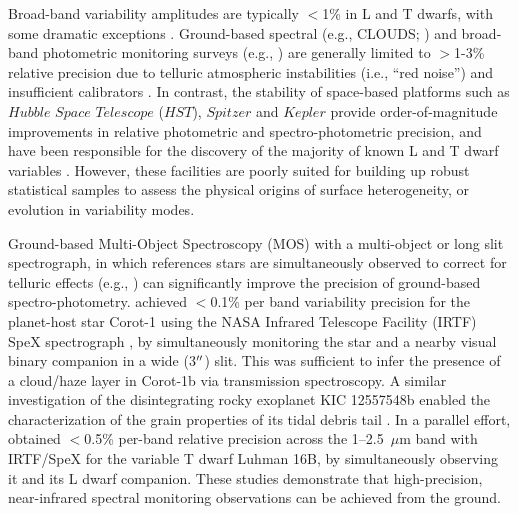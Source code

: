 \documentclass[twocolumn]{aastex6}
\begin{document}
Broad-band variability amplitudes are typically $<$1\% in L and T dwarfs, with some dramatic exceptions \citep{2009ApJ...701.1534A,2012ApJ...750..105R,2013A&A...555L...5G,2016ApJ...829L..32L}. 
Ground-based spectral (e.g., CLOUDS; \citealt{2008A&A...487..277G}) and broad-band photometric monitoring surveys (e.g., \citealt{1999A&A...348..800B,2003MNRAS.346..473K,2014ApJ...793...75R,2014A&A...566A.111W}) are generally limited to $>$1-3\% relative precision due to telluric atmospheric instabilities (i.e., ``red noise'') and insufficient calibrators \citep{2003MNRAS.339..477B}.
In contrast, the stability of space-based platforms such as $Hubble$ $Space$ $Telescope$ ($HST$), $Spitzer$ and $Kepler$ provide order-of-magnitude improvements in relative photometric and spectro-photometric precision, and have been responsible for the discovery of the majority of known L and T dwarf variables \citep{2013ApJ...768..121A,2013ApJ...779..172G,2015ApJ...799..154M}. However, these facilities are poorly suited for building up robust statistical samples to assess the physical origins of surface heterogeneity, or evolution in variability modes. 

Ground-based Multi-Object Spectroscopy (MOS) with a multi-object or long slit spectrograph, in which references stars are simultaneously observed to correct for telluric effects  (e.g., \citealt{bean10,bean2013,gibson13clouds,stevenson2016hatp26}) can significantly improve the precision of ground-based spectro-photometry. \citet{2014ApJ...783....5S} achieved $<$0.1\% per band variability precision for the planet-host star Corot-1 using the NASA Infrared Telescope Facility (IRTF) SpeX spectrograph \citep{2003PASP..115..362R}, by simultaneously monitoring the star and a nearby visual binary companion in a wide (3$\mbox{$^{\prime\prime}$}$) slit. This was sufficient to infer the presence of a cloud/haze layer in Corot-1b via transmission spectroscopy. A similar investigation of the disintegrating rocky exoplanet KIC 12557548b  enabled the characterization of the grain properties of its tidal debris tail \citep{2016ApJ...826..156S}. In a parallel effort, \citet{2014ApJ...785...48B} obtained $<$0.5\% per-band relative precision across the 1--2.5~$\mu$m band with IRTF/SpeX for the variable T dwarf Luhman 16B, by simultaneously observing it and its L dwarf companion. These studies demonstrate that high-precision, near-infrared spectral monitoring observations can be achieved from the ground.
\end{document}
